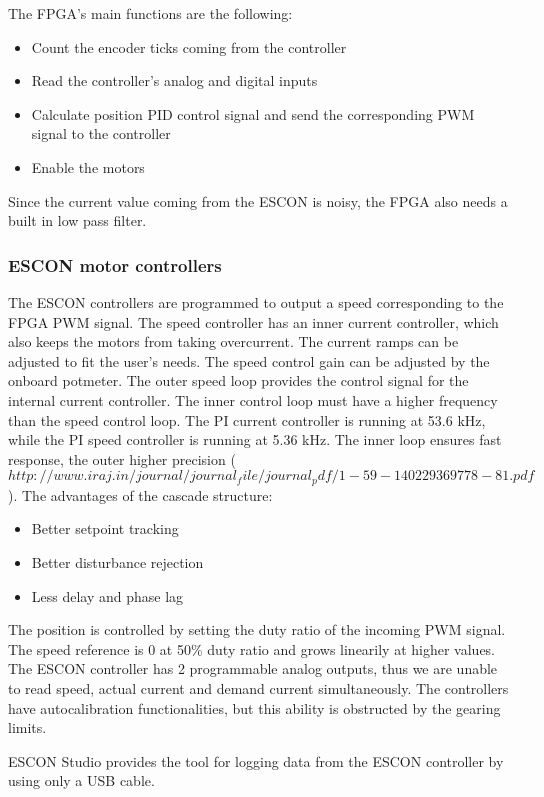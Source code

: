 The FPGA's main functions are the following:

\begin{itemize}	
	\setlength\itemsep{0em}
	\item Count the encoder ticks coming from the controller
	\item Read the controller's analog and digital inputs 
	\item Calculate position PID control signal and send the corresponding PWM signal to the controller
	\item Enable the motors
	
\end{itemize}

Since the current value coming from the ESCON is noisy, the FPGA also needs a built in low pass filter.

\subsubsection{ESCON motor controllers}

The ESCON controllers are programmed to output a speed corresponding to the FPGA PWM signal. The speed controller has an inner current controller, which also keeps the motors from taking overcurrent. The current ramps can be adjusted to fit the user's needs. The speed control gain can be adjusted by the onboard potmeter. 
The outer speed loop provides the control signal for the internal current controller. The inner control loop must have a higher frequency than the speed control loop. The PI current controller is running at 53.6 kHz, while the PI speed controller is running at 5.36 kHz. The inner loop ensures fast response, the outer higher precision ($http://www.iraj.in/journal/journal_file/journal_pdf/1-59-140229369778-81.pdf$). The advantages of the cascade structure:

\begin{itemize}
	\item Better setpoint tracking
	\item Better disturbance rejection
	\item Less delay and phase lag
\end{itemize}

The position is controlled by setting the duty ratio of the incoming PWM signal. The speed reference is 0 at 50\% duty ratio and grows linearily at higher values.
The ESCON controller has 2 programmable analog outputs, thus we are unable to read speed, actual current and demand current simultaneously.
The controllers have autocalibration functionalities, but this ability is obstructed by the gearing limits.

ESCON Studio provides the tool for logging data from the ESCON controller by using only a USB cable.
